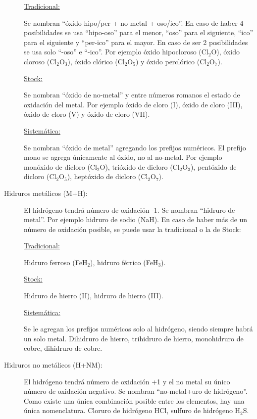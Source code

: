 \begin{description}
\underline{Tradicional:}

Se nombran ``óxido hipo/per + no-metal + oso/ico''. En caso de haber 4 posibilidades se usa ``hipo-oso'' para el menor, ``oso'' para el siguiente, ``ico'' para el siguiente y ``per-ico'' para el mayor. En caso de ser 2 posibilidades se usa solo ``-oso'' e ``-ico''. Por ejemplo óxido hipocloroso (Cl$_2$O), óxido cloroso (Cl$_2$O$_3$), óxido clórico (Cl$_2$O$_5$) y óxido perclórico (Cl$_2$O$_7$).

\underline{Stock:}

Se nombran ``óxido de no-metal'' y entre números romanos el estado de oxidación del metal. Por ejemplo óxido de cloro (I), óxido de cloro (III), óxido de cloro (V) y óxido de cloro (VII).

\underline{Sistemática:}

Se nombran ``óxido de metal'' agregando los prefijos numéricos. El prefijo mono se agrega únicamente al óxido, no al no-metal. Por ejemplo monóxido de dicloro (Cl$_2$O), trióxido de dicloro (Cl$_2$O$_3$), pentóxido de dicloro (Cl$_2$O$_5$), heptóxido de dicloro (Cl$_2$O$_7$).
\skipline




\newpage
\item[Hidruros metálicos (M+H):]\hfil

El hidrógeno tendrá número de oxidación -1. Se nombran ``hidruro de metal''. Por ejemplo hidruro de sodio (NaH). En caso de haber más de un número de oxidación posible, se puede usar la tradicional o la de Stock:

\underline{Tradicional:}

Hidruro ferroso (FeH$_2$), hidruro férrico (FeH$_3$).

\underline{Stock:}

Hidruro de hierro (II), hidruro de hierro (III).

\underline{Sistemática:}

Se le agregan los prefijos numéricos solo al hidrógeno, siendo siempre habrá un solo metal. Dihidruro de hierro, trihidruro de hierro, monohidruro de cobre, dihidruro de cobre.





\item[Hidruros no metálicos (H+NM):]\hfil

El hidrógeno tendrá número de oxidación +1 y el no metal su único número de oxidación negativo. Se nombran ``no-metal+uro de hidrógeno''. Como existe una única combinación posible entre los elementos, hay una única nomenclatura. Cloruro de hidrógeno HCl, sulfuro de hidrógeno H$_2$S.


\end{description}
